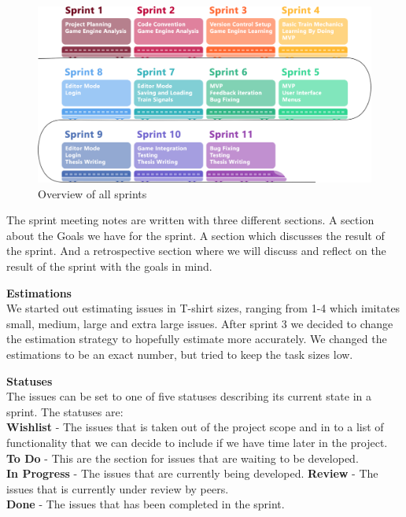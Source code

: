 \begin{figure}[H]
    \centering
    \vspace{12pt}
    \includegraphics[width=\textwidth]{figures/SprintModel.png}
    \caption{Overview of all sprints}
    \label{sprint_overview_img}
\end{figure} 

The sprint meeting notes are written with three different sections. A section about the Goals we have for the sprint. A section which discusses the result of the sprint. And a retrospective section where we will discuss and reflect on the result of the sprint with the goals in mind. 

\textbf{Estimations} \\
We started out estimating issues in T-shirt sizes, ranging from 1-4 which imitates small, medium, large and extra large issues. After sprint 3 we decided to change the estimation strategy to hopefully estimate more accurately. We changed the estimations to be an exact number, but tried to keep the task sizes low.

\textbf{Statuses} \\
The issues can be set to one of five statuses describing its current state in a sprint. The statuses are: \\
\textbf{Wishlist} - The issues that is taken out of the project scope and in to a list of functionality that we can decide to include if we have time later in the project. \\
\textbf{To Do} - This are the section for issues that are waiting to be developed. \\
\textbf{In Progress} - The issues that are currently being developed.
\textbf{Review} - The issues that is currently under review by peers.
\\
\textbf{Done} - The issues that has been completed in the sprint.\\

